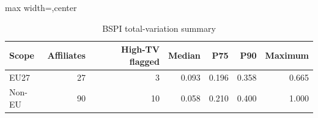 \begin{table}[H]
\centering
\scriptsize
\caption{BSPI total-variation summary}
\label{tab:app_stage1_bspi_tv}
\begin{adjustbox}{max width=\textwidth,center}
\begin{tabular}{@{}lrrrrrr@{}}
\toprule
Scope & Affiliates & High-TV flagged & Median & P75 & P90 & Maximum \\
\midrule
EU27 & 27 &  3 & 0.093 & 0.196 & 0.358 & 0.665 \\
Non-EU & 90 & 10 & 0.058 & 0.210 & 0.400 & 1.000 \\
\bottomrule
\end{tabular}
\end{adjustbox}
\end{table}
